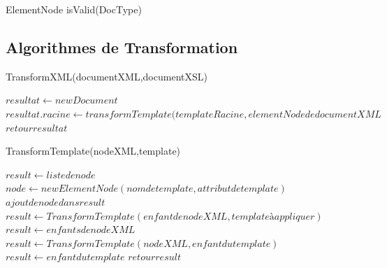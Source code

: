 \begin{algorithm}
\caption{ElementNode isValid(DocType)}
\begin{algorithmic}

\end{algorithmic}
\end{algorithm}

\subsection{Algorithmes de Transformation}

\begin{algorithm}
\caption{TransformXML(documentXML,documentXSL)}
\begin{algorithmic}
\STATE $resultat \leftarrow new Document$
\STATE $resultat.racine \leftarrow transformTemplate(templateRacine,elementNode de documentXML$
\ENDIF
\ENDFOR
\STATE $retour resultat$
\end{algorithmic}
\end{algorithm}

\begin{algorithm}
\caption{TransformTemplate(nodeXML,template)}
\begin{algorithmic}
\STATE $result \leftarrow liste de node$
\STATE $node \leftarrow new ElementNode(nom de template,attribut de template)$
\STATE $ajout de node dans result$
\ENDIF
{}
\STATE $result \leftarrow TransformTemplate(enfant de nodeXML,template à appliquer)$
\ENDIF
{}
\STATE $result \leftarrow enfants de nodeXML$
\ENDIF
\ELSE
\STATE $result \leftarrow TransformTemplate(nodeXML,enfant du template)$
\ENDIF
\ELSE
\STATE $result \leftarrow enfant du template$
\ENDIF
\ENDFOR
\STATE $retour result$
\end{algorithmic}
\end{algorithm}
